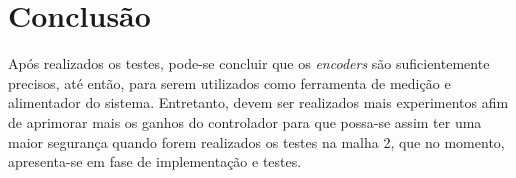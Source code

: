 %
%

\chapter{Conclusão}
\label{chap:conclusao}

Após realizados os testes, pode-se concluir  que os \emph{encoders} são suficientemente precisos, até então, para serem utilizados como ferramenta de medição e alimentador do sistema. Entretanto, devem ser realizados mais experimentos afim de aprimorar mais os ganhos do controlador para que possa-se assim ter uma maior segurança quando forem realizados os testes na malha 2, que no momento, apresenta-se em fase de implementação e testes. 

